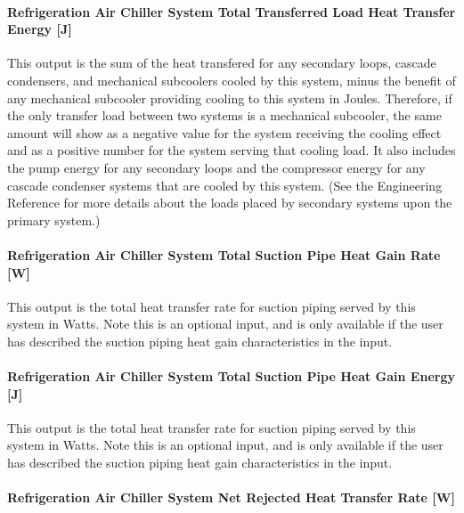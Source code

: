 \paragraph{Refrigeration Air Chiller System Total Transferred Load Heat Transfer Energy {[}J{]}}\label{refrigeration-air-chiller-system-total-transferred-load-heat-transfer-energy-j}

This output is the sum of the heat transfered for any secondary loops, cascade condensers, and mechanical subcoolers cooled by this system, minus the benefit of any mechanical subcooler providing cooling to this system in Joules. Therefore, if the only transfer load between two systems is a mechanical subcooler, the same amount will show as a negative value for the system receiving the cooling effect and as a positive number for the system serving that cooling load. It also includes the pump energy for any secondary loops and the compressor energy for any cascade condenser systems that are cooled by this system. (See the Engineering Reference for more details about the loads placed by secondary systems upon the primary system.)

\paragraph{Refrigeration Air Chiller System Total Suction Pipe Heat Gain Rate {[}W{]}}\label{refrigeration-air-chiller-system-total-suction-pipe-heat-gain-rate-w}

This output is the total heat transfer rate for suction piping served by this system in Watts. Note this is an optional input, and is only available if the user has described the suction piping heat gain characteristics in the input.

\paragraph{Refrigeration Air Chiller System Total Suction Pipe Heat Gain Energy {[}J{]}}\label{refrigeration-air-chiller-system-total-suction-pipe-heat-gain-energy-j}

This output is the total heat transfer rate for suction piping served by this system in Watts. Note this is an optional input, and is only available if the user has described the suction piping heat gain characteristics in the input.

\paragraph{Refrigeration Air Chiller System Net Rejected Heat Transfer Rate {[}W{]}}\label{refrigeration-air-chiller-system-net-rejected-heat-transfer-rate-w}

